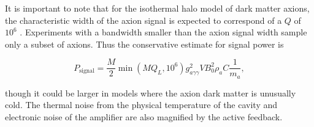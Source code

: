 \documentclass[aps,prl,twocolumn,groupedaddress]{revtex4-1}
\begin{document}
It is important to note that for the isothermal halo model of dark matter axions,  the characteristic width of the axion signal is expected to correspond of a $Q$ of $10^6$ \cite{Cavity_idea}.   Experiments with a bandwidth smaller than the axion signal width sample only a subset of axions.  Thus the conservative estimate for signal power is

\begin{equation}
\label{eqn:sig}
P_{\mathrm{signal}}=\frac{M}{2}\min\left(MQ_L,10^6\right)g_{a\gamma\gamma}^2VB_0^2\rho_aC\frac{1}{m_a},
\end{equation}

though it could be larger in models where the axion dark matter is unusually cold.
The thermal noise from the physical temperature of the cavity and electronic noise of the amplifier are also magnified by the active feedback.
\end{document}
